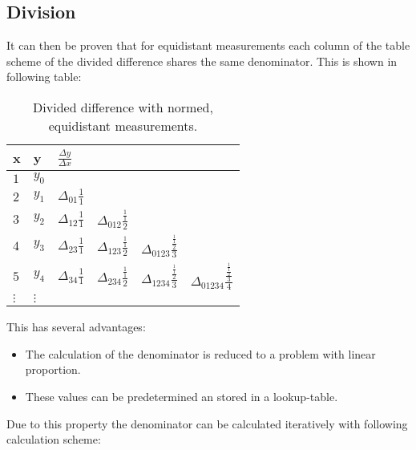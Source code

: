 \subsection{Division}

It can then be proven that for equidistant measurements each column of the
table scheme of the divided difference shares the same denominator. This is
shown in following table:

\begin{table}[H]
	\centering
	\begin{tabular}{ l | l l l l l }
	\textbf{x}	& \textbf{y}	& $\frac{\Delta y}{\Delta x}$	&			&							& \\ \hline
	$1$	& $y_0$	&				&					&							& \\
	$2$	& $y_1$	& $\Delta_{01} \frac{1}{1}$	&					&							& \\
	$3$	& $y_2$	& $\Delta_{12} \frac{1}{1}$	& $\Delta_{012} \frac{\frac{1}{1}}{2}$	&							& \\
	$4$	& $y_3$	& $\Delta_{23} \frac{1}{1}$	& $\Delta_{123} \frac{\frac{1}{1}}{2}$	& $\Delta_{0123} \frac{\frac{\frac{1}{1}}{2}}{3}$	& \\
	$5$	& $y_4$	& $\Delta_{34} \frac{1}{1}$	& $\Delta_{234} \frac{\frac{1}{1}}{2}$	& $\Delta_{1234} \frac{\frac{\frac{1}{1}}{2}}{3}$	& $\Delta_{01234} \frac{\frac{\frac{\frac{1}{1}}{2}}{3}}{4}$ \\
	$\vdots$& $\vdots$	&			&					&							& \\
	\end{tabular}
	\caption{Divided difference with normed, equidistant measurements.}
\end{table}

This has several advantages:
\begin{itemize}
	\item The calculation of the denominator is reduced to a problem with
		linear proportion.
	\item These values can be predetermined an stored in a lookup-table.
\end{itemize}

Due to this property the denominator can be calculated iteratively with
following calculation scheme:

